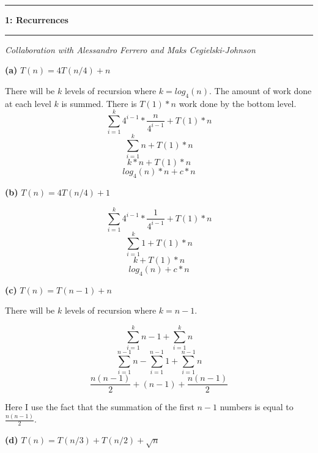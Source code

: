 \documentclass[11pt]{article}
\newcommand\question[2]{\vspace{.25in}\hrule\textbf{#1: #2}\vspace{.5em}\hrule\vspace{.10in}}
\renewcommand\part[1]{\vspace{.10in}\textbf{(#1)}}
\begin{document}
\raggedright
\newcommand\NAME{Jake Pitkin}  %
\newcommand\UID{u0891770}     %
\newcommand\HWNUM{1}              %

\question{1}{Recurrences}
\textit{Collaboration with Alessandro Ferrero and Maks Cegielski-Johnson}

\part{a} $T(n) = 4T(n/4) + n$

There will be $k$ levels of recursion where $k = log_4(n)$. The amount of work done at each level $k$ is summed. There is $T(1) * n$ work done by the bottom level.
$$\sum\limits_{i=1}^k 4^{i-1} * \frac{n}{4^{i-1}} + T(1) * n$$ 
$$\sum\limits_{i=1}^k n + T(1) * n$$
$$k * n + T(1) * n$$
$$log_4(n) * n + c * n$$


\part{b} $T(n) = 4T(n/4) + 1$

$$\sum\limits_{i=1}^k 4^{i-1} * \frac{1}{4^{i-1}} + T(1) * n$$ 
$$\sum\limits_{i=1}^k 1 + T(1) * n$$
$$k  + T(1) * n$$
$$log_4(n) + c * n$$


\part{c} $T(n) = T(n - 1) + n$

There will be $k$ levels of recursion where $ k = n - 1$.

$$\sum\limits_{i=1}^k n-1 + \sum\limits_{i=1}^k n$$
$$\sum\limits_{i=1}^{n-1} n - \sum\limits_{i=1}^{n-1} 1 + \sum\limits_{i=1}^{n-1} n$$
$$\frac{n(n-1)}{2} + (n - 1) + \frac{n(n-1)}{2}$$

Here I use the fact that the summation of the first $n - 1$ numbers is equal to $\frac{n(n-1)}{2}$.


\part{d} $T(n) = T(n/3) + T(n/2) + \sqrt{n}$
\end{document}
